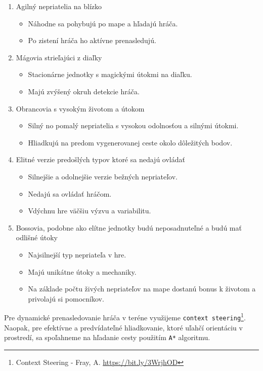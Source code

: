 \begin{enumerate}
    \item Agilný nepriatelia na blízko
    \begin{itemize}
        \item Náhodne sa pohybujú po mape a hľadajú hráča.
        \item Po zistení hráča ho aktívne prenasledujú. 
    \end{itemize}
    \item Mágovia strieľajúci z diaľky
    \begin{itemize}
        \item Stacionárne jednotky s magickými útokmi na diaľku.
        \item Majú zvýšený okruh detekcie hráča.
    \end{itemize}
    \item Obrancovia s vysokým životom a útokom
    \begin{itemize}
        \item Silný no pomalý nepriatelia s vysokou odolnosťou a silnými útokmi.
        \item Hliadkujú na predom vygenerovanej ceste okolo dôležitých bodov.
    \end{itemize}
    \item Elitné verzie predošlých typov ktoré sa nedajú ovládať
    \begin{itemize}
        \item Silnejšie a odolnejšie verzie bežných nepriateľov.
        \item Nedajú sa ovládať hráčom.
        \item Vdýchnu hre väčšiu výzvu a variabilitu.
    \end{itemize}
    \item Bossovia, podobne ako elítne jednotky budú neposadnuteľné a budú mať odlišné útoky
    \begin{itemize}
        \item Najsilnejší typ nepriateľa v hre.
        \item Majú unikátne útoky a mechaniky.
        \item Na základe počtu živých nepriateľov na mape dostanú bonus k životom a privolajú si pomocníkov.
    \end{itemize}
\end{enumerate}

Pre dynamické prenasledovanie hráča v teréne využijeme \verb|context steering|\footnote{Context Steering - Fray, A. \url{https://bit.ly/3WrjhOD}}. Naopak, pre efektívne a predvídateľné hliadkovanie, ktoré uľahčí orientáciu v prostredí, sa spoľahneme na hľadanie cesty použitím \verb|A*| algoritmu.

